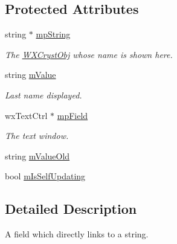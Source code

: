 \subsection*{Protected Attributes}
\begin{DoxyCompactItemize}
\item 
\mbox{\label{class_obj_cryst_1_1_w_x_field_string_af0a4daf786fad26b6bd9939426fdb94a}} 
string $\ast$ \mbox{\hyperlink{class_obj_cryst_1_1_w_x_field_string_af0a4daf786fad26b6bd9939426fdb94a}{mp\+String}}
\begin{DoxyCompactList}\small\item\em The \mbox{\hyperlink{class_obj_cryst_1_1_w_x_cryst_obj}{W\+X\+Cryst\+Obj}} whose name is shown here. \end{DoxyCompactList}\item 
\mbox{\label{class_obj_cryst_1_1_w_x_field_string_a9e283fe8a42b5935bb5c21a7adf17edd}} 
string \mbox{\hyperlink{class_obj_cryst_1_1_w_x_field_string_a9e283fe8a42b5935bb5c21a7adf17edd}{m\+Value}}
\begin{DoxyCompactList}\small\item\em Last name displayed. \end{DoxyCompactList}\item 
\mbox{\label{class_obj_cryst_1_1_w_x_field_string_aa76720da6e7e99c814a6566a54c7b644}} 
wx\+Text\+Ctrl $\ast$ \mbox{\hyperlink{class_obj_cryst_1_1_w_x_field_string_aa76720da6e7e99c814a6566a54c7b644}{mp\+Field}}
\begin{DoxyCompactList}\small\item\em The text window. \end{DoxyCompactList}\item 
string \mbox{\hyperlink{class_obj_cryst_1_1_w_x_field_string_a3764d3f904c5e3709be04a97cc0a1e2b}{m\+Value\+Old}}
\item 
bool \mbox{\hyperlink{class_obj_cryst_1_1_w_x_field_string_aa22ef2e61af183c448dabe73b98d367e}{m\+Is\+Self\+Updating}}
\end{DoxyCompactItemize}


\subsection{Detailed Description}
A field which directly links to a string. 

